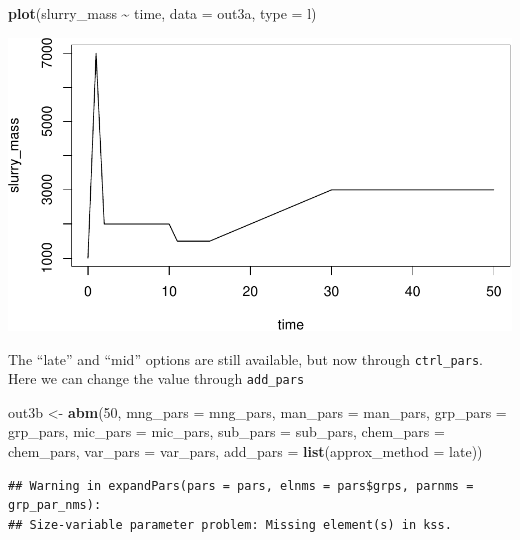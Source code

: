 \documentclass[
]{article}
\newenvironment{Shaded}{\begin{snugshade}}{\end{snugshade}}
\newcommand{\AttributeTok}[1]{\textcolor[rgb]{0.13,0.29,0.53}{#1}}
\newcommand{\DecValTok}[1]{\textcolor[rgb]{0.00,0.00,0.81}{#1}}
\newcommand{\FunctionTok}[1]{\textcolor[rgb]{0.13,0.29,0.53}{\textbf{#1}}}
\newcommand{\NormalTok}[1]{#1}
\newcommand{\OtherTok}[1]{\textcolor[rgb]{0.56,0.35,0.01}{#1}}
\newcommand{\SpecialCharTok}[1]{\textcolor[rgb]{0.81,0.36,0.00}{\textbf{#1}}}
\newcommand{\StringTok}[1]{\textcolor[rgb]{0.31,0.60,0.02}{#1}}
\begin{document}
\begin{Shaded}
\begin{Highlighting}[]
\FunctionTok{plot}\NormalTok{(slurry\_mass }\SpecialCharTok{\textasciitilde{}}\NormalTok{ time, }\AttributeTok{data =}\NormalTok{ out3a, }\AttributeTok{type =} \StringTok{\textquotesingle{}l\textquotesingle{}}\NormalTok{)}
\end{Highlighting}
\end{Shaded}

\includegraphics{simple_demo_files/figure-latex/unnamed-chunk-17-1.pdf}

The ``late'' and ``mid'' options are still available, but now through
\texttt{ctrl\_pars}. Here we can change the value through
\texttt{add\_pars}

\begin{Shaded}
\begin{Highlighting}[]
\NormalTok{out3b }\OtherTok{\textless{}{-}} \FunctionTok{abm}\NormalTok{(}\DecValTok{50}\NormalTok{,}
             \AttributeTok{mng\_pars =}\NormalTok{ mng\_pars,}
             \AttributeTok{man\_pars =}\NormalTok{ man\_pars,}
             \AttributeTok{grp\_pars =}\NormalTok{ grp\_pars,}
             \AttributeTok{mic\_pars =}\NormalTok{ mic\_pars,}
             \AttributeTok{sub\_pars =}\NormalTok{ sub\_pars,}
             \AttributeTok{chem\_pars =}\NormalTok{ chem\_pars,}
             \AttributeTok{var\_pars =}\NormalTok{ var\_pars,}
             \AttributeTok{add\_pars =} \FunctionTok{list}\NormalTok{(}\AttributeTok{approx\_method =} \StringTok{\textquotesingle{}late\textquotesingle{}}\NormalTok{))}
\end{Highlighting}
\end{Shaded}

\begin{verbatim}
## Warning in expandPars(pars = pars, elnms = pars$grps, parnms = grp_par_nms):
## Size-variable parameter problem: Missing element(s) in kss.
\end{verbatim}
\end{document}
